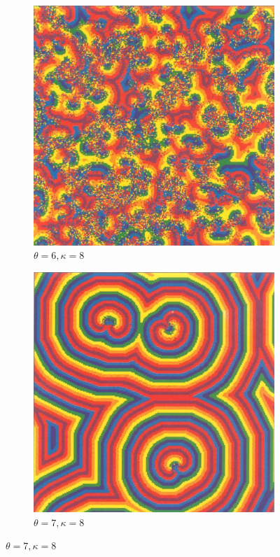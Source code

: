 \begin{figure}[h!]
	\centering
	\begin{subfigure}{0.45\linewidth}
		\includegraphics[width=\linewidth]{gh1} 
		\caption{$\theta=6,\kappa=8$}
		\label{fig:gh1a}
	\end{subfigure}\hfill
	\begin{subfigure}{0.45\linewidth}
		\includegraphics[width=\linewidth]{gh2}
		\caption{$\theta=7,\kappa=8$}
		\label{fig:gh1b}
	\end{subfigure}
	

\end{figure}
